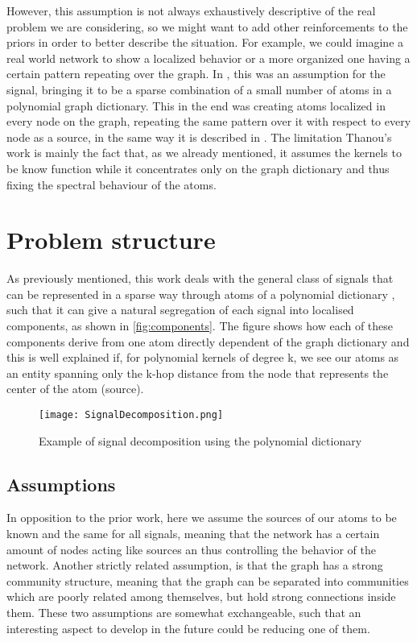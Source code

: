 However, this assumption is not always exhaustively descriptive of the real problem we are considering, so we might want to add other reinforcements to the priors in order to better describe the situation. For example, we could imagine a real world network to show a localized behavior or a more organized one having a certain pattern repeating over the graph. In \cite{Maretic2017}, this was an assumption for the signal, bringing it to be a sparse combination of a small number of atoms in a polynomial graph dictionary. This in the end was creating atoms localized in every node on the graph, repeating the same pattern over it with respect to every node as a source, in the same way it is described in \cite{Thanou2014}. The limitation Thanou's work is mainly the fact that, as we already mentioned, it assumes the kernels to be know function while it concentrates only on the graph dictionary and thus fixing the spectral behaviour of the atoms.

\section{Problem structure}
As previously mentioned, this work deals with the general class of signals that can be represented in a sparse way through atoms of a polynomial dictionary \cite{Thanou2014}, such that it can give a natural segregation of each signal into localised components, as shown in \autoref{fig:components}. The figure shows how each of these components derive from one atom directly dependent of the graph dictionary and this is well explained if, for polynomial kernels of degree k, we see our atoms as an entity spanning only the k-hop distance from the node that represents the center of the atom (source).

\begin{figure}
\centering
\texttt{[image: SignalDecomposition.png]}
\caption{Example of signal decomposition using the polynomial dictionary}
\label{fig:components}
\end{figure}

\subsection{Assumptions}
In opposition to the prior work, here we assume the sources of our atoms to be known and the same for all signals, meaning that the network has a certain amount of nodes acting like sources an thus controlling the behavior of the network. Another strictly related assumption, is that the graph has a strong community structure, meaning that the graph can be separated into communities which are poorly related among themselves, but hold strong connections inside them. These two assumptions are somewhat exchangeable, such that an interesting aspect to develop in the future could be reducing one of them.


